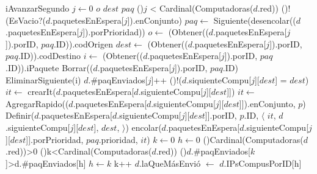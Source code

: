 \begin{Algoritmos}
  \begin{algoritmo}{iAvanzarSegundo}{}{}
     $j \gets 0$
     $o$
     $dest$
     $paq$
    \While(){$j$ < Cardinal(Computadoras($d$.red))}{
      \If(){!(EsVacio?($d$.paquetesEnEspera[$j$]).enConjunto)}{
        $paq \gets$ Siguiente(desencolar(($d$.paquetesEnEspera[$j$]).porPrioridad))
        $o \gets$ (Obtener(($d$.paquetesEnEspera[$j$]).porID, $paq$.ID)).codOrigen
        $dest \gets$ (Obtener(($d$.paquetesEnEspera[$j$]).porID, $paq$.ID)).codDestino
        $i \gets$ (Obtener(($d$.paquetesEnEspera[$j$]).porID, $paq$.ID)).iPaquete
        Borrar(($d$.paquetesEnEspera[$j$]).porID, $paq$.ID)
        EliminarSiguiente(i)
        $d$.\#paqEnviados[$j$]++
        \If(){!($d$.siquienteCompu[$j$][$dest$] = $dest$)}{
          $it \gets$ crearIt($d$.paquetesEnEspera[$d$.siguienteCompu[$j$][$dest$]])
          $it \gets$ AgregarRapido(($d$.paquetesEnEspera[$d$.siguienteCompu[$j$][$dest$]]).enConjunto, $p$)
          Definir($d$.paquetesEnEspera[$d$.siguienteCompu[$j$][$dest$]].porID, $p$.ID, $\langle$ $it$, $d$.siguienteCompu[$j$][$dest$], $dest$, $\rangle$)
          encolar($d$.paquetesEnEspera[$d$.siguienteCompu[$j$][$dest$]].porPrioridad, $paq$.prioridad, $it$)
        }
      }
    }
     $k \gets 0$
     $h \gets 0$
    \If(){Cardinal(Computadoras($d$.red))>0}{
      \While(){k<Cardinal(Computadoras($d$.red))}{
        \If(){$d$.\#paqEnviados[$k$]>d.\#paqEnviados[h]}{
          $h \gets k$
          k++
        }
      }
    }
    $d$.laQueM\'asEnvi\'o $\gets$ $d$.IPsCompusPorID[h]
  \end{algoritmo}
  \datosAlgoritmo{} %
  {} %
  {} %
  {} %
  {} %



\end{Algoritmos}
